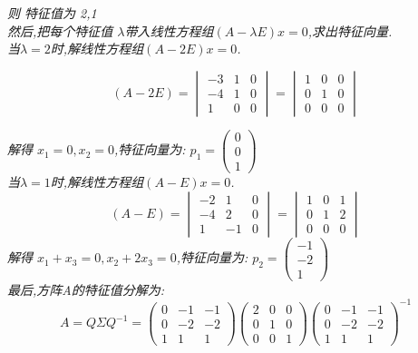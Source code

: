 \documentclass{scrartcl}
\numberwithin{equation}{section}   %
\begin{document}
\textsl{则 特征值为  2,1  \\然后,把每个特征值 $\lambda$带入线性方程组$(A-\lambda E)x =0 $,求出特征向量.
    \\当$\lambda=2$时,解线性方程组$(A-2 E)x =0 $.}


\[
    (A-2E)=\begin{vmatrix} -3& 1& 0\\ -4 & 1& 0\\ 1 & 0 & 0 \end{vmatrix}=\begin{vmatrix} 1& 0& 0\\ 0 & 1& 0\\ 0 & 0 & 0 \end{vmatrix}
\]

\textsl{
    解得 $x_1 =0,x_2 =0$,特征向量为:
    $p_1 = \begin{pmatrix} 0\\0\\1 \end{pmatrix}$
    \\ 当$\lambda=1$时,解线性方程组$(A-E)x =0 $.
}
\[
    (A-E)=\begin{vmatrix} -2& 1& 0\\ -4 & 2& 0\\ 1 &  -1& 0 \end{vmatrix}=\begin{vmatrix} 1& 0& 1\\ 0 & 1& 2\\ 0 & 0 & 0 \end{vmatrix}
\]
\textsl{
    解得 $x_1 + x_3=0,x_2 + 2x_3=0$,特征向量为:
    $p_2 = \begin{pmatrix} -1\\-2\\1 \end{pmatrix}$
    \\ 最后,方阵A的特征值分解为:
}
\[
    A=Q  \Sigma Q^{-1} = \begin{pmatrix} 0& -1& -1\\ 0 & -2& -2\\ 1 &  1& 1 \end{pmatrix}
    \begin{pmatrix} 2& 0& 0\\ 0 & 1& 0\\ 0 &  0& 1 \end{pmatrix}
    \mathrm{\begin{pmatrix} 0& -1& -1\\ 0 & -2& -2\\ 1 &  1& 1 \end{pmatrix}}^{-1}
\]
\end{document}
